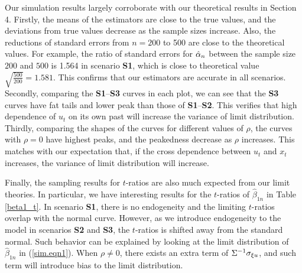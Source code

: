 Our simulation results largely corroborate with our theoretical results in Section 4. Firstly, the means of the estimators are close to the true values, and the deviations from true values decrease as the sample sizes increase. Also, the reductions of standard errors from $n = 200$ to 500 are close to the theoretical values. For example, the ratio of standard errors for $\hat{\alpha}_n$ between the sample size $200$ and $500$ is 1.564 in scenario {\bf S1}, which is close to theoretical value $\sqrt{\frac{500}{200}} = 1.581$. This confirms that our estimators are accurate in all scenarios. Secondly, comparing the {\bf S1}--{\bf S3} curves in each plot, we can see that the {\bf S3} curves have fat tails and lower peak than those of {\bf S1}--{\bf S2}. This verifies that high dependence of $u_t$ on its own past will increase the variance of limit distribution. Thirdly, comparing the shapes of the curves for different values of $\rho$, the curves with $\rho = 0$ have highest peaks, and the peakedness decrease as $\rho$ increases. This matches with our expectation that, if the cross dependence between $u_t$ and $x_t$ increases, the variance of limit distribution will increase.

Finally, the sampling results for $t$-ratios are also much expected from our limit theories. In particular, we have interesting results for the $t$-ratios of $\hat{\beta}_{1n}$ in Table \ref{beta1_t}. In scenario {\bf S1}, there is no endogeneity and the limiting $t$-ratios overlap with the normal curve. However, as we introduce endogeneity to the model in scenarios {\bf S2} and {\bf S3}, the $t$-ratios is shifted away from the standard normal. Such behavior can be explained by looking at the limit distribution of $\hat{\beta}_{1n}$ in (\ref{sim.eqn1}). When $\rho \ne 0$, there exists an extra term of $ \Sigma^{-1} \sigma_{\xi u}$, and such term will introduce bias to the limit distribution.



